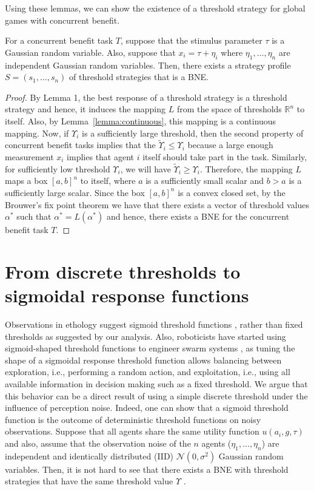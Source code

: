 \documentclass[smallextended]{svjour3}       %
\def\R{\mathbb{R}}    %
\def\td{\Upsilon}     %
\begin{document}
Using these lemmas, we can show the existence of a threshold strategy for global games with concurrent benefit. 
\begin{theorem}\label{thrm:mainthrm}
For a concurrent benefit task $T$, suppose that the stimulus parameter $\tau$ is a Gaussian random variable. Also, suppose that $x_i=\tau+\eta_i$ where $\eta_1,\ldots,\eta_n$ are independent Gaussian random variables. Then, there exists a strategy profile $S=(s_1,\ldots,s_n)$ of threshold strategies that is a BNE.
\end{theorem}
\begin{proof}
By Lemma 1, the best response of a threshold strategy is a threshold strategy and hence, it induces the mapping $L$ from the space of thresholds $\R^n$ to itself. Also, by Lemma~\ref{lemma:continuous}, this mapping is a continuous mapping. Now, if $\td_i$ is a sufficiently large threshold, then the second property of concurrent benefit tasks implies that the $\tilde{\td}_i\leq \td_i$ because a large enough measurement $x_i$ implies that agent $i$ itself should take part in the task. Similarly, for sufficiently low threshold $\td_i$, we will have $\tilde{\td}_i\geq \td_i$. Therefore, the mapping $L$ maps a box $[a,b]^n$ to itself, where $a$ is a sufficiently small scalar and $b>a$ is a sufficiently large scalar. Since the box $[a,b]^n$ is a convex closed set, by the Brouwer's fix point theorem \citep{Border1990} we have that there exists a vector of threshold values $\alpha^*$ such that $\alpha^*=L(\alpha^*)$ and hence, there exists a BNE for the concurrent benefit task $T$.
\end{proof}

\section{From discrete thresholds to sigmoidal response functions}\label{sec:continuous}
Observations in ethology suggest sigmoid threshold functions \citep{Bonabeau1996}, rather than fixed thresholds as suggested by our analysis. Also, roboticists have started using sigmoid-shaped threshold functions to engineer swarm systems \citep{Bonabeau1996,Theraulaz1998,Krieger2000}, as tuning the shape of a sigmoidal response threshold function allows balancing between exploration, i.e., performing a random action, and exploitation, i.e., using all available information in decision making such as a fixed threshold. 
We argue that this behavior can be a direct result of using a simple discrete threshold under the influence of perception noise. Indeed, one can show that a sigmoid threshold function is the outcome of deterministic threshold functions on noisy observations. Suppose that all  agents share the same utility function $u(a_i,g,\tau)$ and also, assume that the observation noise of the $n$ agents ($\eta_1,\ldots,\eta_n$) are independent and identically distributed (IID) $\mathcal{N}(0,\sigma^2)$ Gaussian random variables. Then, it is not hard to see that there exists a BNE with threshold strategies that have the same threshold value $\td$ \citep{Morris2000}.
\end{document}
